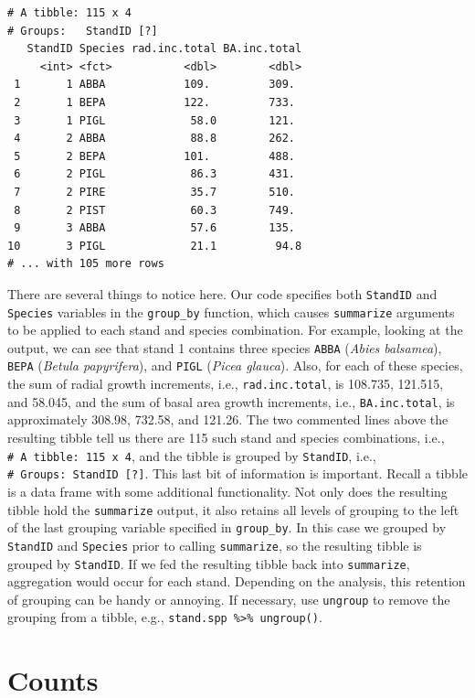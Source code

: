\documentclass[]{krantz}
\theoremstyle{definition}
\theoremstyle{definition}
\theoremstyle{definition}
\theoremstyle{remark}
\begin{document}
\begin{verbatim}
# A tibble: 115 x 4
# Groups:   StandID [?]
   StandID Species rad.inc.total BA.inc.total
     <int> <fct>           <dbl>        <dbl>
 1       1 ABBA            109.         309. 
 2       1 BEPA            122.         733. 
 3       1 PIGL             58.0        121. 
 4       2 ABBA             88.8        262. 
 5       2 BEPA            101.         488. 
 6       2 PIGL             86.3        431. 
 7       2 PIRE             35.7        510. 
 8       2 PIST             60.3        749. 
 9       3 ABBA             57.6        135. 
10       3 PIGL             21.1         94.8
# ... with 105 more rows
\end{verbatim}

There are several things to notice here. Our code specifies both
\texttt{StandID} and \texttt{Species} variables in the
\texttt{group\_by} function, which causes \texttt{summarize} arguments
to be applied to each stand and species combination. For example,
looking at the output, we can see that stand 1 contains three species
\texttt{ABBA} (\emph{Abies balsamea}), \texttt{BEPA} (\emph{Betula
papyrifera}), and \texttt{PIGL} (\emph{Picea glauca}). Also, for each of
these species, the sum of radial growth increments, i.e.,
\texttt{rad.inc.total}, is 108.735, 121.515, and 58.045, and the sum of
basal area growth increments, i.e., \texttt{BA.inc.total}, is
approximately 308.98, 732.58, and 121.26. The two commented lines above
the resulting tibble tell us there are 115 such stand and species
combinations, i.e., \texttt{\#\ A\ tibble:\ 115\ x\ 4}, and the tibble
is grouped by \texttt{StandID}, i.e.,
\texttt{\#\ Groups:\ StandID\ {[}?{]}}. This last bit of information is
important. Recall a tibble is a data frame with some additional
functionality. Not only does the resulting tibble hold the
\texttt{summarize} output, it also retains all levels of grouping to the
left of the last grouping variable specified in \texttt{group\_by}. In
this case we grouped by \texttt{StandID} and \texttt{Species} prior to
calling \texttt{summarize}, so the resulting tibble is grouped by
\texttt{StandID}. If we fed the resulting tibble back into
\texttt{summarize}, aggregation would occur for each stand. Depending on
the analysis, this retention of grouping can be handy or annoying. If
necessary, use \texttt{ungroup} to remove the grouping from a tibble,
e.g., \texttt{stand.spp\ \%\textgreater{}\%\ ungroup()}.

\section{Counts}\label{counts}
\end{document}
